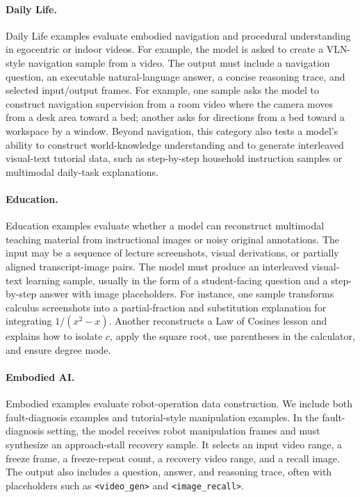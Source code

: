\paragraph{Daily Life.}
Daily Life examples evaluate embodied navigation and procedural understanding in egocentric or indoor videos. For example, the model is asked to create a VLN-style navigation sample from a video. The output must include a navigation question, an executable natural-language answer, a concise reasoning trace, and selected input/output frames. For example, one sample asks the model to construct navigation supervision from a room video where the camera moves from a desk area toward a bed; another asks for directions from a bed toward a workspace by a window. 
Beyond navigation, this category also tests a model's ability to construct world-knowledge understanding and to generate interleaved visual-text tutorial data, such as step-by-step household instruction samples or multimodal daily-task explanations.

\paragraph{Education.}
Education examples evaluate whether a model can reconstruct multimodal teaching material from instructional images or noisy original annotations. The input may be a sequence of lecture screenshots, visual derivations, or partially aligned transcript-image pairs. The model must produce an interleaved visual-text learning sample, usually in the form of a student-facing question and a step-by-step answer with image placeholders. For instance, one sample transforms calculus screenshots into a partial-fraction and substitution explanation for integrating \(1/(x^2-x)\). Another reconstructs a Law of Cosines lesson and explains how to isolate \(c\), apply the square root, use parentheses in the calculator, and ensure degree mode. 

\paragraph{Embodied AI.}
Embodied examples evaluate robot-operation data construction. We include both fault-diagnosis examples and tutorial-style manipulation examples. In the fault-diagnosis setting, the model receives robot manipulation frames and must synthesize an approach-stall recovery sample. It selects an input video range, a freeze frame, a freeze-repeat count, a recovery video range, and a recall image. The output also includes a question, answer, and reasoning trace, often with placeholders such as \texttt{<video\_gen>} and \texttt{<image\_recall>}. 


